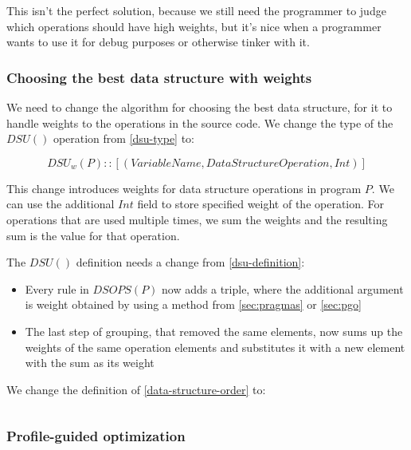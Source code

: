 \documentclass[a4paper,11pt]{article}
\begin{document}
			This isn't the perfect solution, because we still need the programmer to judge which operations
			should have high weights, but it's nice when a programmer wants to use it for debug purposes or
			otherwise tinker with it.

		\subsubsection{Choosing the best data structure with weights} \label{sec:choose-weights}

			We need to change the algorithm for choosing the best data structure, for it to handle weights
			to the operations in the source code. We change the type of the $DSU()$ operation from
			\autoref{dsu-type} to:

			\begin{equation}
				DSU_w(P) :: [(VariableName, DataStructureOperation, Int)]
			\end{equation}

			This change introduces weights for data structure operations in program $P$. We can use the
			additional $Int$ field to store specified weight of the operation.  For operations that are used
			multiple times, we sum the weights and the resulting sum is the value for that operation.

			The $DSU()$ definition needs a change from \autoref{dsu-definition}:

			\begin{itemize}
				\item Every rule in $DSOPS(P)$ now adds a triple, where the additional argument is
					weight obtained by using a method from \autoref{sec:pragmas} or
					\autoref{sec:pgo}

				\item The last step of grouping, that removed the same elements, now sums up the weights
					of the same operation elements and substitutes it with a new element with the
					sum as its weight
			\end{itemize}

			We change the definition of \autoref{data-structure-order} to:

			\begin{equation}
			\end{equation}

		\subsubsection{Profile-guided optimization} \label{sec:pgo}
\end{document}
